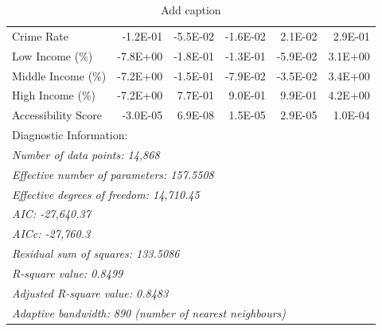 \begin{table}[htbp]
\begin{tabular}{llllll}
    Crime Rate & \multicolumn{1}{r}{-1.2E-01} & \multicolumn{1}{r}{-5.5E-02} & \multicolumn{1}{r}{-1.6E-02} & \multicolumn{1}{r}{2.1E-02} & \multicolumn{1}{r}{2.9E-01} \\
    Low Income (\%) & \multicolumn{1}{r}{-7.8E+00} & \multicolumn{1}{r}{-1.8E-01} & \multicolumn{1}{r}{-1.3E-01} & \multicolumn{1}{r}{-5.9E-02} & \multicolumn{1}{r}{3.1E+00} \\
    Middle Income (\%) & \multicolumn{1}{r}{-7.2E+00} & \multicolumn{1}{r}{-1.5E-01} & \multicolumn{1}{r}{-7.9E-02} & \multicolumn{1}{r}{-3.5E-02} & \multicolumn{1}{r}{3.4E+00} \\
    High Income (\%) & \multicolumn{1}{r}{-7.2E+00} & \multicolumn{1}{r}{7.7E-01} & \multicolumn{1}{r}{9.0E-01} & \multicolumn{1}{r}{9.9E-01} & \multicolumn{1}{r}{4.2E+00} \\
    Accessibility Score & \multicolumn{1}{r}{-3.0E-05} & \multicolumn{1}{r}{6.9E-08} & \multicolumn{1}{r}{1.5E-05} & \multicolumn{1}{r}{2.9E-05} & \multicolumn{1}{r}{1.0E-04} \\
    \midrule
    \multicolumn{6}{l}{Diagnostic Information:} \\
    \multicolumn{6}{l}{\textit{Number of data points: 14,868}} \\
    \multicolumn{6}{l}{\textit{Effective number of parameters: 157.5508}} \\
    \multicolumn{6}{l}{\textit{Effective degrees of freedom: 14,710.45 }} \\
    \multicolumn{6}{l}{\textit{AIC:  -27,640.37 }} \\
    \multicolumn{6}{l}{\textit{AICc:  -27,760.3 }} \\
    \multicolumn{6}{l}{\textit{Residual sum of squares: 133.5086}} \\
    \multicolumn{6}{l}{\textit{R-square value: 0.8499}} \\
    \multicolumn{6}{l}{\textit{Adjusted R-square value: 0.8483}} \\
    \multicolumn{6}{l}{\textit{Adaptive bandwidth: 890 (number of nearest neighbours)}} \\
    \end{tabular}%
    \caption{Add caption}
  \label{tab:addlabel}%
\end{table}%


